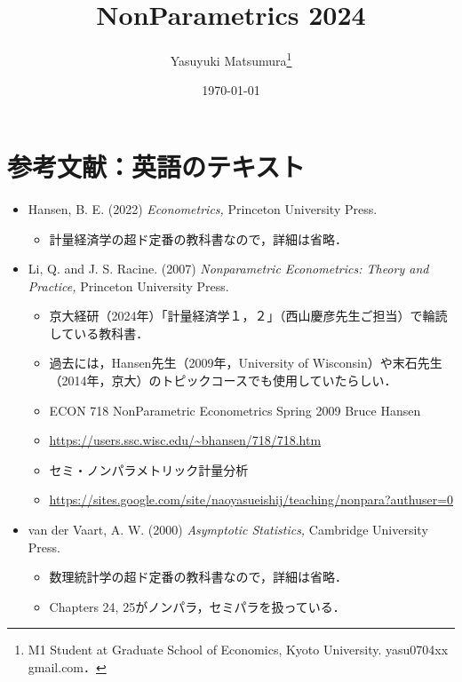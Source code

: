 \documentclass[a4paper,10pt]{jarticle}
\title{NonParametrics 2024}
\author{Yasuyuki Matsumura\thanks{M1 Student at Graduate School of Economics, Kyoto University. yasu0704xx \text{@} gmail.com．}}
\date{\today} %
\begin{document}
\maketitle %

\section{参考文献：英語のテキスト}

\begin{itemize}
  \item Hansen, B. E. (2022)
        \textit{Econometrics,} Princeton University Press.
        \begin{itemize}
          \item 計量経済学の超ド定番の教科書なので，詳細は省略．
        \end{itemize}
  
  \item Li, Q. and J. S. Racine. (2007)
        \textit{Nonparametric Econometrics: Theory and Practice,} 
        Princeton University Press.

        \begin{itemize}
        \item 京大経研（2024年）「計量経済学１，２」（西山慶彦先生ご担当）で輪読している教科書．
        \item 過去には，Hansen先生（2009年，University of Wisconsin）や末石先生（2014年，京大）のトピックコースでも使用していたらしい．
        \item ECON 718 NonParametric Econometrics Spring 2009 Bruce Hansen 
        \item \url{https://users.ssc.wisc.edu/~bhansen/718/718.htm}
        \item セミ・ノンパラメトリック計量分析 
        \item \url{https://sites.google.com/site/naoyasueishij/teaching/nonpara?authuser=0}
        \end{itemize}
  
  \item van der Vaart, A. W. (2000) 
  \textit{Asymptotic Statistics,} Cambridge University Press.
        \begin{itemize}
          \item 数理統計学の超ド定番の教科書なので，詳細は省略．
          \item Chapters 24, 25がノンパラ，セミパラを扱っている．
        \end{itemize}

\end{itemize}
\end{document}

